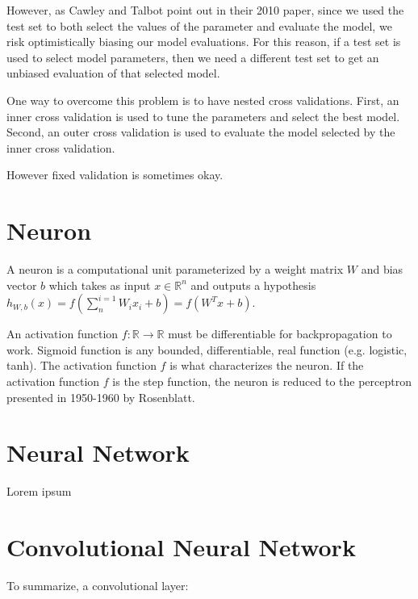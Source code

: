 However, as Cawley and Talbot point out in their 2010 paper, since we used the test set to both select the values of the parameter and evaluate the model, we risk optimistically biasing our model evaluations. For this reason, if a test set is used to select model parameters, then we need a different test set to get an unbiased evaluation of that selected model.

One way to overcome this problem is to have nested cross validations. First, an inner cross validation is used to tune the parameters and select the best model. Second, an outer cross validation is used to evaluate the model selected by the inner cross validation.

However fixed validation is sometimes okay.

\section{Neuron}

A neuron is a computational unit parameterized by a weight matrix $W$ and bias vector $b$ which takes as input $x \in \mathbb{R}^{n}$ and outputs a hypothesis $h_{W,b}(x) = f(\sum^{i=1}_{n} W_{i}x_{i} + b) = f(W^Tx + b)$.

An activation function $f \colon \mathbb{R} \to \mathbb{R}$ must be differentiable for backpropagation to work. Sigmoid function is any bounded, differentiable, real function (e.g. logistic, tanh).
The activation function $f$ is what characterizes the neuron. If the activation function $f$ is the step function, the neuron is reduced to the perceptron presented in 1950-1960 by Rosenblatt\cite{perceptron}.

\section{Neural Network}

Lorem ipsum

\section{Convolutional Neural Network}

To summarize, a convolutional layer:

